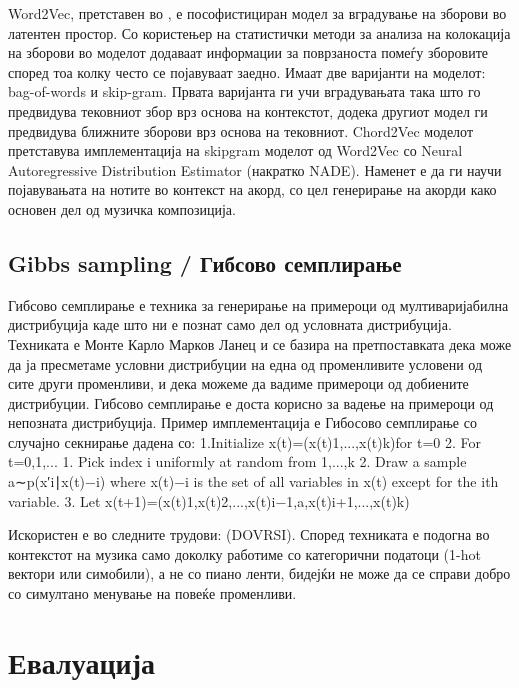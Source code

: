 Word2Vec, претставен во \cite{Mikolov2013}, е пософистициран модел за вградување на зборови во латентен простор. Со користењер на статистички методи за анализа на колокација на зборови во моделот додаваат информации за поврзаноста помеѓу зборовите според тоа колку често се појавуваат заедно. Имаат две варијанти на моделот: bag-of-words и skip-gram. Првата варијанта ги учи вградувањата така што го предвидува тековниот збор врз основа на контекстот, додека другиот модел ги предвидува ближните зборови врз основа на тековниот. 
Chord2Vec \cite{Madjiheurem2016} моделот претставува имплементација на skipgram моделот од Word2Vec со Neural Autoregressive Distribution Estimator (накратко NADE). Наменет е да ги научи појавувањата на нотите во контекст на акорд, со цел генерирање на акорди како основен дел од музичка композиција. 

\section{Gibbs sampling / Гибсово семплирање}

Гибсово семплирање е техника за генерирање на примероци од мултиваријабилна дистрибуција каде што ни е познат само дел од условната дистрибуција. Техниката е Монте Карло Марков Ланец и се базира на претпоставката дека може да ја пресметаме условни дистрибуции на една од променливите условени од сите други променливи, и дека можеме да вадиме примероци од добиените дистрибуции. Гибсово семплирање е доста корисно за вадење на примероци од непозната дистрибуција. Пример имплементација е Гибосово семплирање со случајно секнирање дадена со:
1.Initialize x(t)=(x(t)1,...,x(t)k)for t=0
2. For t=0,1,...
    1. Pick index i uniformly at random from 1,...,k
    2. Draw a sample a∼p(x′i∣x(t)−i) where x(t)−i is the set of all variables in x(t) except for the ith variable.
    3. Let x(t+1)=(x(t)1,x(t)2,...,x(t)i−1,a,x(t)i+1,...,x(t)k)

Искористен е во следните трудови: \cite{Hadjeres2016} (DOVRSI). Според \cite{Hadjeres2016} техниката е подогна во контекстот на музика само доколку работиме со категорични податоци (1-hot вектори или симобили), а не со пиано ленти, бидејќи не може да се справи добро со симултано менување на повеќе променливи.

\chapter{Евалуација}
\label{ch:evaluacija}

